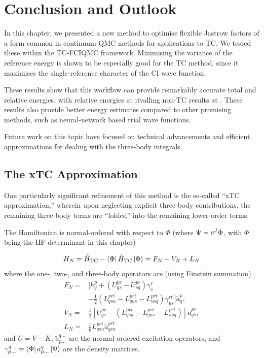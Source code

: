 \section{Conclusion and Outlook}

In this chapter, we presented a new method to optimise flexible Jastrow factors of a form common in continuum QMC methods for applications to TC. We tested these within the TC-FCIQMC framework. Minimising the variance of the reference energy is shown to be especially good for the TC method, since it maximises the single-reference character of the CI wave function.

These results show that this workflow can provide remarkably accurate total and relative energies, with relative energies at \vtz rivalling non-TC results at . These results also provide better energy estimates compared to other promising methods, such as neural-network based trial wave functions.

Future work on this topic have focused on technical advancements and efficient approximations for dealing with the three-body integrals.

\subsection{The xTC Approximation}

One particularly significant refinement of this method is the so-called ``xTC approximation,''\supercite{christlmaierXTC2023} wherein upon neglecting explicit three-body contributions, the remaining three-body terms are ``folded'' into the remaining lower-order terms.

The Hamiltonian is normal-ordered with respect to $\Phi$ (where $\Psi=\mathrm{e}^J\Phi$, with $\Phi$ being the HF determinant in this chapter)

\begin{equation}
    H_N = \hat H_\mathrm{TC} - \bra{\Phi}\hat H_\mathrm{TC}\ket\Phi = F_N + V_N + L_N
\end{equation}
where the one-, two-, and three-body operators are (using Einstein summation)
\begin{align}
F_N =& [h_q^p + (U_{qs}^{pr}-U_{sq}^{pr})\gamma_s^r \\
&- \frac 12 (L_{qsu}^{prt} - L_{qus}^{prt}-L_{usq}^{prt})\gamma_{us}^{rt}]
\tilde a_q^p, \\
V_N =& \frac 12[U_{qs}^{pr} - (L_{qsu}^{prt} - L_{qus}^{prt}-L_{usq}^{prt})]\tilde a_{qs}^{pr}, \\
L_N =& \frac 16L_{qsu}^{prt}\tilde a_{qsu}^{prt}
\end{align}
and $U=V-K$, $\tilde a_{p\dots}^{q\dots}$ are the normal-ordered
excitation operators, and $\gamma_{p\dots}^{q\dots}=\bra\Phi a_{p\dots}^{q\dots}\ket\Phi$ are the density matrices.

